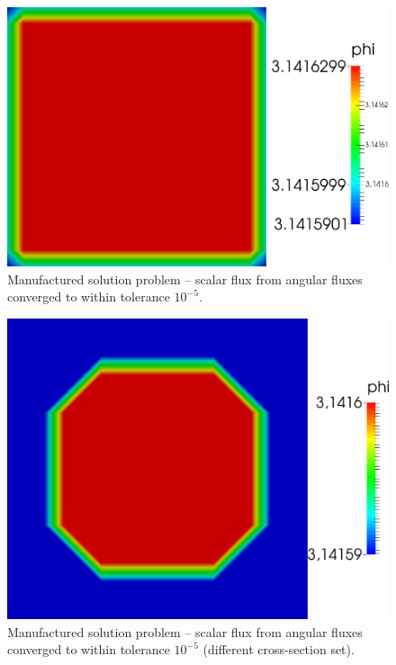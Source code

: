 \begin{figure}[!ht]
\centering
  \includegraphics[scale=.24]{exact/phi}
  \caption[Manufactured solution problem -- scalar flux]{Manufactured solution problem -- scalar
  flux from angular fluxes converged to within tolerance $10^{-5}$.}
  \label{fig:16}
\end{figure}

\begin{figure}[!ht]
\centering
  \includegraphics[scale=.2]{exact/phi2}
  \caption[Manufactured solution problem -- scalar flux]{Manufactured solution problem -- scalar
  flux from angular fluxes converged to within tolerance $10^{-5}$ (different cross-section set).}
  \label{fig:17}
\end{figure} 

